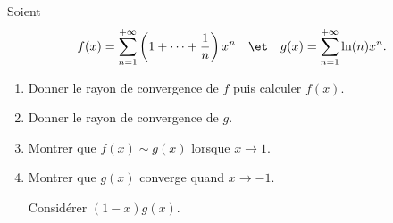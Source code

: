 \begin{enonce}
\begin{exercise}[ID={RMS130 E717},subtitle={Mines-Ponts PSI 2019},tags={}]
Soient
\begin{equation*}
  f(x) = \sum_{n=1}^{+\infty} \left( 1 + \dots + \frac1n \right)x^n
  \quad\et\quad
  g(x) = \sum_{n=1}^{+\infty} \ln(n) x^n.
\end{equation*}
\begin{enumerate}
  \item Donner le rayon de convergence de $f$ puis calculer $f(x)$.
  \item Donner le rayon de convergence de $g$.
  \item Montrer que $f(x)\sim g(x)$ lorsque $x\to 1$.
  \item Montrer que $g(x)$ converge quand $x\to -1$.
        \begin{hint} Considérer $(1-x)g(x)$.  \end{hint}
\end{enumerate}

\end{exercise}
\begin{solution}
\end{solution}
\end{enonce}
